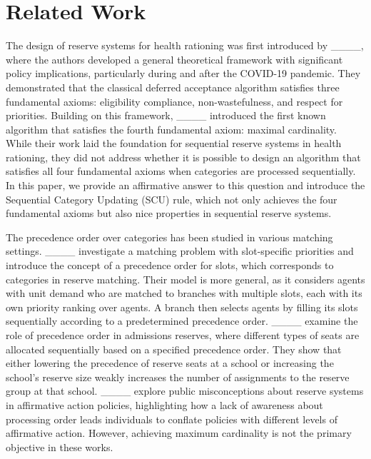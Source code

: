 \section{Related Work}
\label{section:literature}

The design of reserve systems for health rationing was first introduced by ____, where the authors developed a general theoretical framework with significant policy implications, particularly during and after the COVID-19 pandemic. They demonstrated that the classical deferred acceptance algorithm satisfies three fundamental axioms: eligibility compliance, non-wastefulness, and respect for priorities. Building on this framework, ____ introduced the first known algorithm that satisfies the fourth fundamental axiom: maximal cardinality. While their work laid the foundation for sequential reserve systems in health rationing, they did not address whether it is possible to design an algorithm that satisfies all four fundamental axioms when categories are processed sequentially. In this paper, we provide an affirmative answer to this question and introduce the Sequential Category Updating (SCU) rule, which not only achieves the four fundamental axioms but also nice properties in sequential reserve systems.

The precedence order over categories has been studied in various matching settings.  
____ investigate a matching problem with slot-specific priorities and introduce the concept of a precedence order for slots, which corresponds to categories in reserve matching. Their model is more general, as it considers agents with unit demand who are matched to branches with multiple slots, each with its own priority ranking over agents. A branch then selects agents by filling its slots sequentially according to a predetermined precedence order.  
%
____ examine the role of precedence order in admissions reserves, where different types of seats are allocated sequentially based on a specified precedence order. They show that either lowering the precedence of reserve seats at a school or increasing the school's reserve size weakly increases the number of assignments to the reserve group at that school. 
%
____ explore public misconceptions about reserve systems in affirmative action policies, highlighting how a lack of awareness about processing order leads individuals to conflate policies with different levels of affirmative action.  
%
However, achieving maximum cardinality is not the primary objective in these works.  



